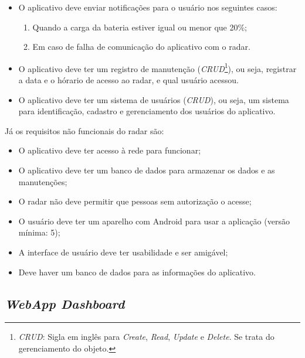 \begin{itemize}
    \item O aplicativo deve enviar notificações para o usuário nos seguintes casos:
    \begin{enumerate}
        \item Quando a carga da bateria estiver igual ou menor que 20\%;
        \item Em caso de falha de comunicação do aplicativo com o radar.
    \end{enumerate}
\end{itemize} 
 
 
\begin{itemize}
     \item O aplicativo deve ter um registro de manutenção (\textit{CRUD}\footnote{\textit{CRUD}: Sigla em inglês para \textit{Create}, \textit{Read}, \textit{Update} e \textit{Delete}. Se trata do gerenciamento do objeto.}), ou seja, registrar a data e o hórario de acesso ao radar, e qual usuário acessou.
\end{itemize}
 
\begin{itemize}
     \item O aplicativo deve ter um sistema de usuários (\textit{CRUD}), ou seja, um sistema para identificação, cadastro e gerenciamento dos usuários do aplicativo.
\end{itemize}

Já os requisitos não funcionais do radar são:

\begin{itemize}
    \item O aplicativo deve ter acesso à rede para funcionar;
    \item O aplicativo deve ter um banco de dados para armazenar os dados e as manutenções;
    \item O radar não deve permitir que pessoas sem autorização o acesse;
    \item O usuário deve ter um aparelho com Android para usar a aplicação (versão mínima: 5);
    \item A interface de usuário deve ter usabilidade e ser amigável;
    \item Deve haver um banco de dados para as informações do aplicativo.
\end{itemize}

\subsection{\textit{WebApp Dashboard}}

